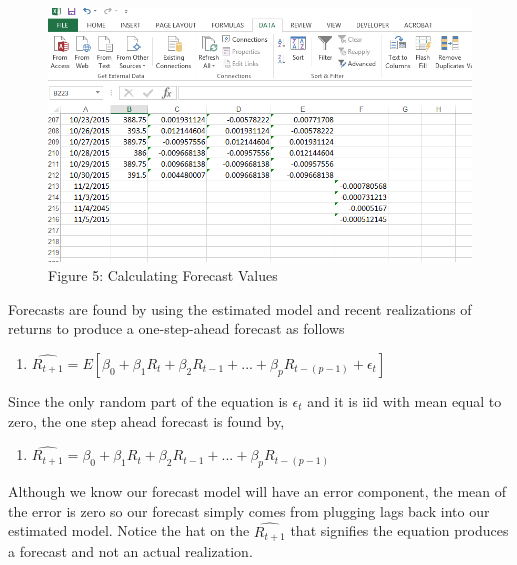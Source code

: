 \documentclass[
  letterpaper,
  DIV=11,
  numbers=noendperiod]{scrreprt}
\providecommand{\tightlist}{%
  \setlength{\itemsep}{0pt}\setlength{\parskip}{0pt}}\usepackage{longtable,booktabs,array}
\begin{document}
\begin{figure}

{\centering \includegraphics{images/12_forecast_screenshot.png}

}

\caption{Figure 5: Calculating Forecast Values}

\end{figure}

Forecasts are found by using the estimated model and recent realizations
of returns to produce a one-step-ahead forecast as follows

\begin{enumerate}
\def\labelenumi{\arabic{enumi}.}
\setcounter{enumi}{2}
\tightlist
\item
  \(\hat{R_{t+1}} = E[\beta_0 + \beta_1R_{t} + \beta_2R_{t-1}+ ... + \beta_{p}R_{t-(p-1)} + \epsilon_t]\)
\end{enumerate}

Since the only random part of the equation is \(\epsilon_t\) and it is
iid with mean equal to zero, the one step ahead forecast is found by,

\begin{enumerate}
\def\labelenumi{\arabic{enumi}.}
\setcounter{enumi}{3}
\tightlist
\item
  \(\hat{R_{t+1}} = \beta_0 + \beta_1R_{t} + \beta_2R_{t-1}+ ... + \beta_{p}R_{t-(p-1)}\)
\end{enumerate}

Although we know our forecast model will have an error component, the
mean of the error is zero so our forecast simply comes from plugging
lags back into our estimated model. Notice the hat on the
\(\hat{R_{t+1}}\) that signifies the equation produces a forecast and
not an actual realization.
\end{document}
